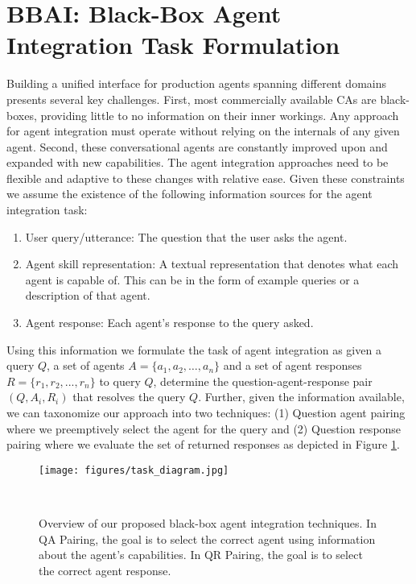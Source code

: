 \documentclass[11pt]{article}
\begin{document}
\section{BBAI: Black-Box Agent Integration Task Formulation} \label{sec_task}
 Building a unified interface for production agents spanning different domains presents several key challenges. 
First, most commercially available CAs are black-boxes, providing little to no information on their inner workings. Any approach for agent integration must operate without relying on the internals of any given agent.
 Second, these conversational agents are constantly improved upon and expanded with new capabilities. The agent integration approaches need to be flexible and adaptive to these changes with relative ease. Given these constraints we assume the existence of the following information sources for the agent integration task:
 \begin{enumerate}
     \item User query/utterance: The question that the user asks the agent.
     
     \item Agent skill representation: A textual representation that denotes what each agent is capable of. This can be in the form of example queries or a description of that agent.
     
     \item Agent response: Each agent's response to the query asked.
 \end{enumerate}

Using this information we formulate the task of agent integration as given a query $Q$, a set of agents $A = \{a_{1}, a_{2}, \ldots, a_{n}\}$ and a set of agent responses $R = \{r_{1}, r_{2}, ..., r_{n}\}$ to query $Q$, determine the question-agent-response pair $(Q, A_{i}, R_{i})$ that resolves the query $Q$. Further, given the information available, we can taxonomize our approach into  two techniques: (1) Question agent pairing where we preemptively select the agent for the query and (2) Question response pairing where we evaluate the set of returned responses as depicted in Figure \ref{fig:task}.

\begin{figure}
  \centering
  \texttt{[image: figures/task\_diagram.jpg]}
  \caption{Overview of our proposed black-box agent integration techniques. In QA Pairing, the goal is to select the correct agent using information about the agent's capabilities. In QR Pairing, the goal is to select the correct agent response.}
  ~\label{fig:task}
  \vspace{-1.8pc}
\end{figure}
\end{document}
